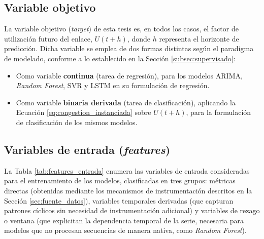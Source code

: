 \documentclass[12pt]{report}
\begin{document}
\subsection*{Variable objetivo}

La variable objetivo (\textit{target}) de esta tesis es, en todos los casos, el factor de utilización futuro del enlace, $U(t+h)$, donde $h$ representa el horizonte de predicción. Dicha variable se emplea de dos formas distintas según el paradigma de modelado, conforme a lo establecido en la Sección \ref{subsec:supervisado}:

\begin{itemize}
    \item Como variable \textbf{continua} (tarea de regresión), para los modelos ARIMA, \textit{Random Forest}, SVR y LSTM en su formulación de regresión.
    \item Como variable \textbf{binaria derivada} (tarea de clasificación), aplicando la Ecuación \ref{eq:congestion_instanciada} sobre $U(t+h)$, para la formulación de clasificación de los mismos modelos.
\end{itemize}

\subsection*{Variables de entrada (\textit{features})}

La Tabla \ref{tab:features_entrada} enumera las variables de entrada consideradas para el entrenamiento de los modelos, clasificadas en tres grupos: métricas directas (obtenidas mediante los mecanismos de instrumentación descritos en la Sección \ref{sec:fuente_datos}), variables temporales derivadas (que capturan patrones cíclicos sin necesidad de instrumentación adicional) y variables de rezago o ventana (que explicitan la dependencia temporal de la serie, necesaria para modelos que no procesan secuencias de manera nativa, como \textit{Random Forest}).
\end{document}

